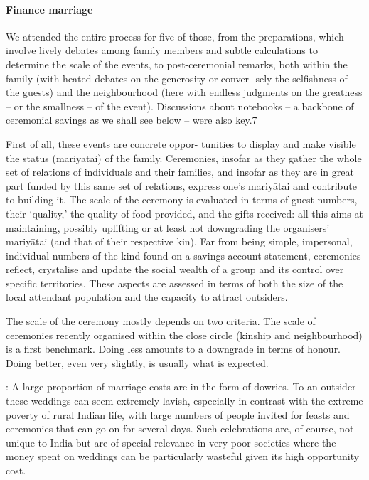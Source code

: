 \documentclass[a4paper, 11pt, onecolumn]{article}
\begin{document}
\paragraph{Finance marriage}


\cite{Guerin2020c}
We attended the entire process for five of those, from the preparations, which involve
lively debates among family members and subtle calculations to determine the scale of the events, to
post-ceremonial remarks, both within the family (with heated debates on the generosity or conver-
sely the selfishness of the guests) and the neighbourhood (here with endless judgments on the greatness – or the smallness – of the event). Discussions about notebooks – a backbone of ceremonial
savings as we shall see below – were also key.7

First of all, these events are concrete oppor-
tunities to display and make visible the status (mariyātai) of the family. Ceremonies, insofar as they
gather the whole set of relations of individuals and their families, and insofar as they are in great part
funded by this same set of relations, express one’s mariyātai and contribute to building it. The scale of
the ceremony is evaluated in terms of guest numbers, their ‘quality,’ the quality of food provided, and
the gifts received: all this aims at maintaining, possibly uplifting or at least not downgrading the
organisers’ mariyātai (and that of their respective kin). Far from being simple, impersonal, individual
numbers of the kind found on a savings account statement, ceremonies reflect, crystalise and update
the social wealth of a group and its control over specific territories. These aspects are assessed in
terms of both the size of the local attendant population and the capacity to attract outsiders.

The scale of the ceremony mostly depends on two criteria. The scale of ceremonies recently
organised within the close circle (kinship and neighbourhood) is a first benchmark. Doing less
amounts to a downgrade in terms of honour. Doing better, even very slightly, is usually what is
expected.






\cite{Bloch2004} : 
A large proportion of marriage costs are in the form of dowries.
To an outsider these weddings can seem extremely lavish, especially in contrast
with the extreme poverty of rural Indian life, with large numbers of people invited for
feasts and ceremonies that can go on for several days. Such celebrations are, of
course, not unique to India but are of special relevance in very poor societies where
the money spent on weddings can be particularly wasteful given its high opportunity
cost. 
\end{document}
